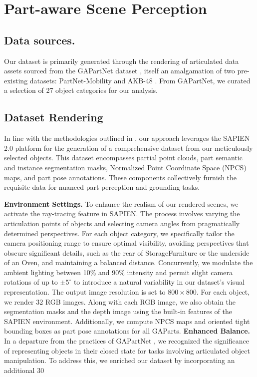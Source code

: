 \documentclass[conference]{IEEEtran}
\begin{document}
\section{Part-aware Scene Perception}

\subsection{Data sources.} Our dataset is primarily generated through the rendering of articulated data assets sourced from the GAPartNet dataset \citep{geng2022gapartnet}, itself an amalgamation of two pre-existing datasets: PartNet-Mobility \citep{xiang2020sapien} and AKB-48 \citep{liu2022akb}. From GAPartNet, we curated a selection of 27 object categories for our analysis.


\subsection{Dataset Rendering}

In line with the methodologies outlined in \citep{geng2022gapartnet}, our approach leverages the SAPIEN 2.0 platform \citep{xiang2020sapien} for the generation of a comprehensive dataset from our meticulously selected objects. This dataset encompasses partial point clouds, part semantic and instance segmentation masks, Normalized Point Coordinate Space (NPCS) maps, and part pose annotations. These components collectively furnish the requisite data for nuanced part perception and grounding tasks.

\textbf{Environment Settings.} To enhance the realism of our rendered scenes, we activate the ray-tracing feature in SAPIEN. The process involves varying the articulation points of objects and selecting camera angles from pragmatically determined perspectives. For each object category, we specifically tailor the camera positioning range to ensure optimal visibility, avoiding perspectives that obscure significant details, such as the rear of StorageFurniture or the underside of an Oven, and maintaining a balanced distance. Concurrently, we modulate the ambient lighting between 10\% and 90\% intensity and permit slight camera rotations of up to $\pm 5^\circ$ to introduce a natural variability in our dataset's visual representation.
The output image resolution is set to $800 \times 800$. For each object, we render 32 RGB images. Along with each RGB image, we also obtain the segmentation masks and the depth image using the built-in features of the SAPIEN environment. Additionally, we compute NPCS maps and oriented tight bounding boxes as part pose annotations for all GAParts.
\textbf{Enhanced Balance.} In a departure from the practices of GAPartNet \citep{geng2022gapartnet}, we recognized the significance of representing objects in their closed state for tasks involving articulated object manipulation. To address this, we enriched our dataset by incorporating an additional 30%
\end{document}
